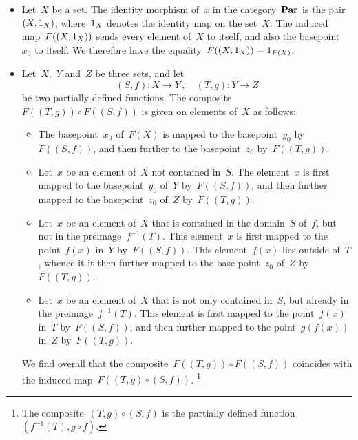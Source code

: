 \begin{itemize}

	\item
		Let~$X$ be a set.
		The identity morphism of~$x$ in the category~$\mathbf{Par}$ is the pair~$(X, 1_X)$, where~$1_X$ denotes the identity map on the set~$X$.
		The induced map~$F( (X, 1_X) )$ sends every element of~$X$ to itself, and also the basepoint~$x_0$ to itself.
		We therefore have the equality~$F( (X, 1_X) ) = 1_{F(X)}$.

	\item
		Let~$X$,~$Y$ and~$Z$ be three sets, and let
		\[
			(S, f) \colon X \to Y \,,
			\quad
			(T, g) \colon Y \to Z
		\]
		be two partially defined functions.
		The composite~$F( (T, g) ) ∘ F( (S, f) )$ is given on elements of~$X$ as follows:
		\begin{itemize}

			\item
				The basepoint~$x_0$ of~$F(X)$ is mapped to the basepoint~$y_0$ by~$F( (S, f) )$, and then further to the basepoint~$z_0$ by~$F( (T, g) )$.

			\item
				Let~$x$ be an element of~$X$ not contained in~$S$.
				The element~$x$ is first mapped to the basepoint~$y_0$ of~$Y$ by~$F( (S, f) )$, and then further mapped to the basepoint~$z_0$ of~$Z$ by~$F( (T, g) )$.

			\item
				Let~$x$ be an element of~$X$ that is contained in the domain~$S$ of~$f$, but not in the preimage~$f^{-1}(T)$.
				This element~$x$ is first mapped to the point~$f(x)$ in~$Y$ by~$F( (S, f) )$.
				This element~$f(x)$ lies outside of~$T$, whence it it then further mapped to the base point~$z_0$ of~$Z$ by~$F( (T, g) )$.

			\item
				Let~$x$ be an element of~$X$ that is not only contained in~$S$, but already in the preimage~$f^{-1}(T)$.
				This element is first mapped to the point~$f(x)$ in~$T$ by~$F( (S, f) )$, and then further mapped to the point~$g(f(x) )$ in~$Z$ by~$F( (T, g) )$.

		\end{itemize}
		We find overall that the composite~$F( (T, g) ) ∘ F( (S, f) )$ coincides with the induced map~$F( (T, g) ∘ (S, f) )$.%
		\footnote{
			The composite~$(T, g) ∘ (S, f)$ is the partially defined function~$(f^{-1}(T), g ∘ f)$.
		}
\end{itemize}

